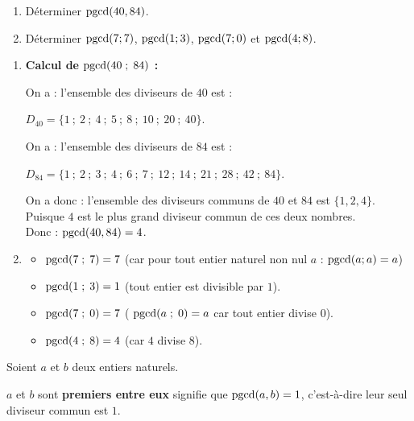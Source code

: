 \documentclass[10pt, a4paper]{article}
\begin{document}
\begin{Application}[][10 min]
\begin{enumerate}[leftmargin=*,itemsep=0.5pt]
    \item Déterminer $\operatorname{pgcd}(40, 84)$.

    \item Déterminer $\operatorname{pgcd}(7;7)$, $\operatorname{pgcd}(1;3)$,  $\operatorname{pgcd}(7;0)$ et $\operatorname{pgcd}(4;8)$.

\end{enumerate}
\end{Application}

\begin{Solution}[APPLICATION][11]
\begin{enumerate}[leftmargin=*,itemsep=0.5pt]
    \item \textbf{Calcul de $\operatorname{pgcd}(40 \; ; \; 84)$ :}
    
    On a : l'ensemble des diviseurs de $40$ est : 
    
    $D_{40} = \big\{1~;~2~;~4~;~5~;~8~;~10~;~20~;~40\big\}$.
    
    On a : l'ensemble des diviseurs de $84$ est :
    
    $D_{84} = \big\{1~;~2~;~3~;~4~;~6~;~7~;~12~;~14~;~21~;~28~;~42~;~84\big\}$.
    
    On a donc : l'ensemble des diviseurs communs de $40$ et $84$ est $\big\{1, 2, 4\big\}$. \\
    Puisque $4$ est le plus grand diviseur commun de ces deux nombres. \\
    Donc : \quad $\operatorname{pgcd}(40, 84) = 4$.

    \item
    \begin{itemize}[leftmargin=*,itemsep=0.5pt]
        \item $\operatorname{pgcd}(7 \; ; \; 7) = 7$ \quad
        (car pour tout entier naturel non nul $a$ : $\operatorname{pgcd}(a ; a) = a$)
        \item $\operatorname{pgcd}(1 \; ; \; 3) = 1$ \quad (tout entier est divisible par $1$).
        \item $\operatorname{pgcd}(7 \; ; \; 0) = 7$ \quad ( $\operatorname{pgcd}(a \; ; \; 0) = a$ car tout entier divise $0$).
        \item $\operatorname{pgcd}(4 \; ; \; 8) = 4$ \quad (car $4$ divise $8$).
    \end{itemize}
\end{enumerate}
\end{Solution}


\begin{Definition}
Soient $a$ et $b$ deux entiers naturels.

$a$ et $b$ sont \textbf{premiers entre eux} signifie que $\operatorname{pgcd}(a,b) = 1$,
c'est-à-dire leur seul diviseur commun est $1$.
\end{Definition}
\end{document}
